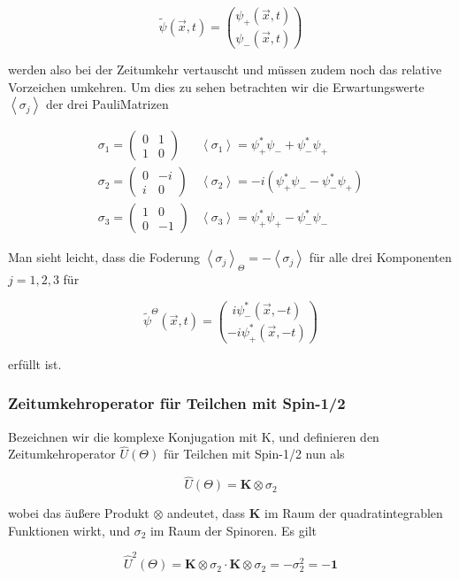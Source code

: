 \documentclass[10pt, letterpaper]{article}
\begin{document}
$$
\widetilde{\psi}(\vec{x}, t)=\binom{\psi_{+}(\vec{x}, t)}{\psi_{-}(\vec{x}, t)}
$$

werden also bei der Zeitumkehr vertauscht und müssen zudem noch das relative Vorzeichen umkehren. Um dies zu sehen betrachten wir die Erwartungswerte $\left\langle\sigma_{j}\right\rangle$ der drei PauliMatrizen

$$
\begin{array}{ll}
\sigma_{1}=\left(\begin{array}{cc}
0 & 1 \\
1 & 0
\end{array}\right) & \left\langle\sigma_{1}\right\rangle=\psi_{+}^{*} \psi_{-}+\psi_{-}^{*} \psi_{+} \\
\sigma_{2}=\left(\begin{array}{cc}
0 & -i \\
i & 0
\end{array}\right) & \left\langle\sigma_{2}\right\rangle=-i\left(\psi_{+}^{*} \psi_{-}-\psi_{-}^{*} \psi_{+}\right) \\
\sigma_{3}=\left(\begin{array}{cc}
1 & 0 \\
0 & -1
\end{array}\right) & \left\langle\sigma_{3}\right\rangle=\psi_{+}^{*} \psi_{+}-\psi_{-}^{*} \psi_{-}
\end{array}
$$

Man sieht leicht, dass die Foderung $\left\langle\sigma_{j}\right\rangle_{\Theta}=-\left\langle\sigma_{j}\right\rangle$ für alle drei Komponenten $j=1,2,3$ für

$$
\widetilde{\psi}^{\Theta}(\vec{x}, t)=\binom{i \psi_{-}^{*}(\vec{x},-t)}{-i \psi_{+}^{*}(\vec{x},-t)}
$$

erfüllt ist.

\subsubsection*{Zeitumkehroperator für Teilchen mit Spin-1/2}
Bezeichnen wir die komplexe Konjugation mit K, und definieren den Zeitumkehroperator $\widehat{U}(\Theta)$ für Teilchen mit Spin-1/2 nun als

$$
\widehat{U}(\Theta)=\mathbf{K} \otimes \sigma_{2}
$$

wobei das äußere Produkt $\otimes$ andeutet, dass $\mathbf{K}$ im Raum der quadratintegrablen Funktionen wirkt, und $\sigma_{2}$ im Raum der Spinoren. Es gilt

$$
\widehat{U}^{2}(\Theta)=\mathbf{K} \otimes \sigma_{2} \cdot \mathbf{K} \otimes \sigma_{2}=-\sigma_{2}^{2}=-\mathbf{1}
$$
\end{document}
